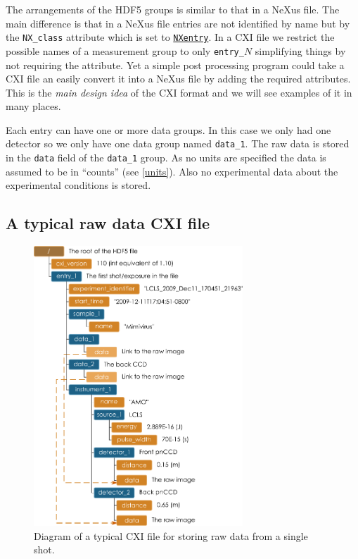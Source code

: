 \documentclass[usletter,11pt]{article}
\begin{document}
The arrangements of the HDF5 groups is similar to that in a NeXus file. The main difference is that in a NeXus file entries are not identified by name but by the {\tt NX\_class} attribute which is set to \hyperref[table:entry]{\tt NXentry}. In a CXI file we restrict the possible names of a measurement group to only {\tt entry\_$N$} simplifying things by not requiring the attribute. Yet a simple post processing program could take a CXI file an easily convert it into a NeXus file by adding the required attributes. This is the {\em main design idea} of the CXI format and we will see examples of it in many places.

Each entry can have one or more data groups. In this case we only had one detector so we only have one data group named {\tt data\_1}. The raw data is stored in the {\tt data} field of the {\tt data\_1} group. As no units are specified the data is assumed to be in ``counts'' (see \ref{units}). Also no experimental data about the experimental conditions is stored.

\subsection{A typical raw data CXI file}

\begin{figure}[h!]
\centering
\includegraphics[width=0.7\textwidth]{lcls_camp_cxi.pdf}
\caption{Diagram of a typical CXI file for storing raw data from a single shot.}
\label{fig:lcls_camp_raw}
\end{figure}
\end{document}
